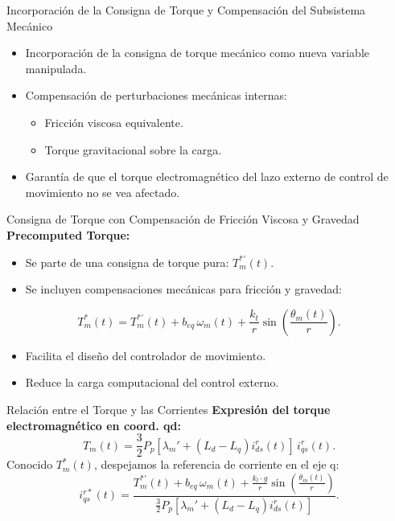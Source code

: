 \documentclass[12pt]{beamer}
\begin{document}
\begin{frame}{Incorporación de la Consigna de Torque y Compensación del Subsistema Mecánico}
    \begin{itemize}
        \item Incorporación de la consigna de torque mecánico como nueva variable manipulada.
        \item Compensación de perturbaciones mecánicas internas:
        \begin{itemize}
            \item Fricción viscosa equivalente.
            \item Torque gravitacional sobre la carga.
        \end{itemize}
        \item Garantía de que el torque electromagnético del lazo externo de control de movimiento no se vea afectado.
    \end{itemize}
\end{frame}

\begin{frame}{Consigna de Torque con Compensación de Fricción Viscosa y Gravedad}
    \textbf{Precomputed Torque:}
    \begin{itemize}
        \item Se parte de una consigna de torque pura: $T_m^{*'}(t)$.
        \item Se incluyen compensaciones mecánicas para fricción y gravedad:
    \end{itemize}
    \begin{equation}
        T_m^{*}(t) = T_m^{*'}(t) + b_{eq}\,\omega_m(t) + \frac{k_t}{r}\sin\left(\frac{\theta_m(t)}{r}\right).
    \end{equation}
    \begin{itemize}
        \item Facilita el diseño del controlador de movimiento.
        \item Reduce la carga computacional del control externo.
    \end{itemize}
\end{frame}

\begin{frame}{Relación entre el Torque y las Corrientes}
    \textbf{Expresión del torque electromagnético en coord. qd:}
    \begin{equation}
        T_m(t) = \frac{3}{2} P_p [ \lambda_m' + (L_d - L_q)i_{ds}^r(t) ]\, i_{qs}^r(t).
    \end{equation}
    Conocido \(T_m^{*}(t)\), despejamos la referencia de corriente en el eje q: \
    \begin{equation}
        i_{qs}^{r*}(t) = \frac{T_m^{*'}(t) + b_{eq}\,\omega_m(t) + \frac{k_l \cdot g}{r}\sin\left(\frac{\theta_m(t)}{r}\right)}{\frac{3}{2}P_p[\lambda_m' + (L_d - L_q)i_{ds}^r(t)]}.
    \end{equation}
\end{frame}
\end{document}
